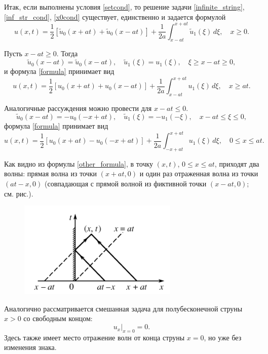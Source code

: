 Итак, если выполнены условия \eqref{setcond}, то решение задачи \eqref{infinite_string}, \eqref{inf_str_cond}, \eqref{x0cond} существует, единственно и задается формулой 
\begin{equation} \label{formula}
	u(x, t) = \frac{1}{2} [\tilde{u}_0(x + a t) + \tilde{u}_0(x - a t)] + \frac{1}{2 a} \int_{x - a t}^{x + a t} \tilde{u}_1(\xi) \, d\xi, \quad x \geqslant 0.
\end{equation}

Пусть $x - a t \geqslant 0$. Тогда
\begin{equation}
	\tilde{u}_0(x - a t) = \tilde{u}_0(x - a t), \quad \tilde{u}_1(\xi) = u_1(\xi), \quad \xi \geqslant x - a t \geqslant 0,
\end{equation}
и формула \eqref{formula} принимает вид 
\begin{equation}
	u(x, t) = \frac{1}{2} [u_0(x + a t) + u_0(x - a t)] + \frac{1}{2 a} \int_{x - a t}^{x + a t} u_1(\xi) \, d\xi, \quad x \geqslant at.
\end{equation}

Аналогичные рассуждения можно провести для $x - a t \leqslant 0$. 
\begin{equation*}
	\tilde{u}_0(x - a t) = - u_0(-x + a t), \quad \tilde{u}_1(\xi) = -u_1(-\xi), \quad x - a t \leqslant \xi \leqslant 0,
\end{equation*}
формула \eqref{formula} принимает вид
\begin{equation} \label{other_formula}
	u(x, t) = \frac{1}{2} [u_0(x + a t) - u_0(-x + a t)] + \frac{1}{2a} \int_{-x + a t}^{x + a t} u_1(\xi) \,d\xi, \quad 0 \leqslant x \leqslant a t.
\end{equation}

Как видно из формулы \eqref{other_formula}, в точку $(x, t)$, $0 \leqslant x \leqslant a t$, приходят два волны: прямая волна из точки $(x + a t, 0)$ и один раз отраженная волна из точки $(a t - x, 0)$ (совпадающая с прямой волной из фиктивной точки $(x - at, 0)$; см. рис.).

\begin{figure}
	\centering
	\includegraphics[width=0.9\linewidth]{img/mirror3}
	\caption{}
\end{figure}

Аналогично рассматривается смешанная задача для полубесконечной струны $x > 0$ со свободным концом:
\begin{equation*}
	u_x|_{x = 0} = 0.
\end{equation*}
Здесь также имеет место отражение волн от конца струны $x = 0$, но уже без изменения знака. 
